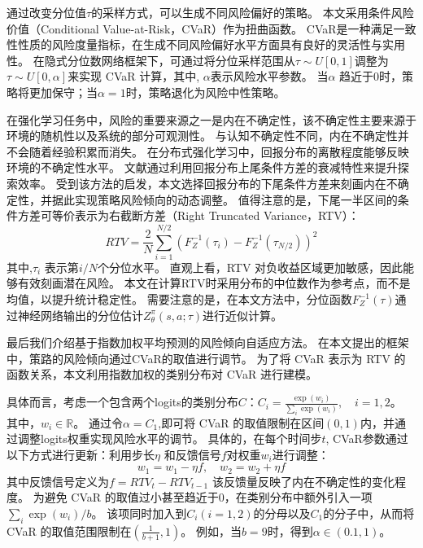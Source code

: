 通过改变分位值$\tau$的采样方式，可以生成不同风险偏好的策略。
本文采用条件风险价值（Conditional Value-at-Risk，CVaR）\cite{filippi2020conditional}作为扭曲函数。
CVaR是一种满足一致性性质的风险度量指标\cite{majumdar2019should}，在生成不同风险偏好水平方面具有良好的灵活性与实用性。
在隐式分位数网络框架下，可通过将分位采样范围从$\tau \sim U[0,1]$调整为$\tau \sim U[0, \alpha]$来实现 CVaR 计算，其中, $\alpha$表示风险水平参数。
当$\alpha$ 趋近于0时，策略将更加保守；当$\alpha=1$时，策略退化为风险中性策略。

在强化学习任务中，风险的重要来源之一是内在不确定性，该不确定性主要来源于环境的随机性以及系统的部分可观测性。
与认知不确定性\cite{clements2019estimating}不同，内在不确定性并不会随着经验积累而消失。
在分布式强化学习中，回报分布的离散程度能够反映环境的不确定性水平\cite{moskovitz2021deep}。
文献通过利用回报分布上尾条件方差的衰减特性来提升探索效率。
受到该方法的启发，本文选择回报分布的下尾条件方差来刻画内在不确定性，并据此实现策略风险倾向的动态调整。
值得注意的是，下尾一半区间的条件方差可等价表示为右截断方差（Right Truncated Variance，RTV）：
\begin{equation}
R T V=\frac{2}{N} \sum_{i=1}^{N / 2}\left(F_{Z}^{-1}\left(\tau_{i}\right)-F_{Z}^{-1}\left(\tau_{N / 2}\right)\right)^{2}
\end{equation}
其中,$\tau_{i}$  表示第$i/N$个分位水平。
直观上看，RTV 对负收益区域更加敏感，因此能够有效刻画潜在风险。
本文在计算RTV时采用分布的中位数作为参考点，而不是均值，以提升统计稳定性\cite{maronna2019robust}。
需要注意的是，在本文方法中，分位函数$F_{Z}^{-1}(\tau)$通过神经网络输出的分位估计$Z_{\theta}^{\pi}(s, a ; \tau)$进行近似计算。

最后我们介绍基于指数加权平均预测的风险倾向自适应方法。
在本文提出的框架中，策路的风险倾向通过CVaR的取值进行调节。
为了将 CVaR 表示为 RTV 的函数关系，本文利用指数加权的类别分布对 CVaR 进行建模。

具体而言，考虑一个包含两个logits的类别分布$C$：$C_{i}=\frac{\exp \left(w_{i}\right)}{\sum_{i} \exp \left(w_{i}\right)}, \quad i=1,2$。
其中，$w_{i} \in \mathbb{R}$。
通过令$\alpha=C_{1}$,即可将 CVaR 的取值限制在区间$(0,1)$内，并通过调整logits权重实现风险水平的调节。
具体的，在每个时间步$t$, CVaR参数通过以下方式进行更新：利用步长$\eta$ 和反馈信号$f$对权重$w_{i}$进行调整：
\begin{equation}
w_{1}=w_{1}-\eta f, \quad w_{2}=w_{2}+\eta f
\end{equation}
其中反馈信号定义为$f=R T V_{t}-R T V_{t-1}$
该反馈量反映了内在不确定性的变化程度。
为避免 CVaR 的取值过小甚至趋近于0，在类别分布中额外引入一项$\sum_{i} \exp \left(w_{i}\right) / b$。
该项同时加入到$C_{i}(i=1,2)$的分母以及$C_{1}$的分子中，从而将 CVaR 的取值范围限制在$\left(\frac{1}{b+1}, 1\right)$。
例如，当$b=9$时，得到$\alpha \in(0.1,1)$。

